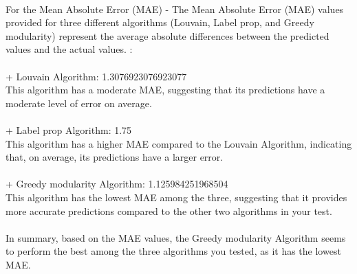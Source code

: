 \\
\indent For the Mean Absolute Error (MAE) - 
The Mean Absolute Error (MAE) values provided for three different algorithms (Louvain, Label prop, and Greedy modularity) represent the average absolute differences between the predicted values and the actual values. : \\ \\
+ Louvain Algorithm: 1.3076923076923077 \\
This algorithm has a moderate MAE, suggesting that its predictions have a moderate level of error on average.\\
\\
+ Label prop Algorithm: 1.75 \\
This algorithm has a higher MAE compared to the Louvain Algorithm, indicating that, on average, its predictions have a larger error.\\
\\
+ Greedy modularity Algorithm: 1.125984251968504 \\
This algorithm has the lowest MAE among the three, suggesting that it provides more accurate predictions compared to the other two algorithms in your test.\\
\\
\indent In summary, based on the MAE values, the Greedy modularity Algorithm seems to perform the best among the three algorithms you tested, as it has the lowest MAE. 

